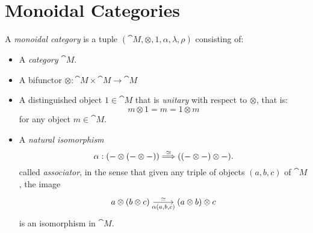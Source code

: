 \documentclass[../../deep-dive]{subfiles}
\begin{document}
\section{Monoidal Categories}

\begin{definition}
    \label{def:monoidal-category}
    A \emph{monoidal category} is a tuple
    \((\cat M, \otimes, 1, \alpha, \lambda, \rho)\) consisting of:
    \begin{itemize}\setlength\itemsep{0em}
        \item A \emph{category} \(\cat M\).

        \item A bifunctor \(\otimes: \cat M \times \cat M \to \cat M\)

        \item A distinguished object \(1 \in \cat M\) that is \emph{unitary} with
              respect to \(\otimes\), that is:
              \[
                  m \otimes 1 = m = 1 \otimes m
              \]
              for any object \(m \in \cat M\).

        \item A \emph{natural isomorphism}
              \[
                  \alpha: (- \otimes (- \otimes -))
                  \overset{\simeq}\Longrightarrow ((- \otimes -) \otimes -).
              \]
              called \emph{associator}, in the sense that given any triple of objects \((a,
              b, c)\) of \(\cat M\), the image
              \[
                  \begin{tikzcd}
                      a \otimes (b \otimes c)
                      \ar[r, "{\alpha(a, b, c)}"', "\dis"]
                      &(a \otimes b) \otimes c
                  \end{tikzcd}
              \]
              is an isomorphism in \(\cat M\).


\end{itemize}
\end{definition}
\end{document}

